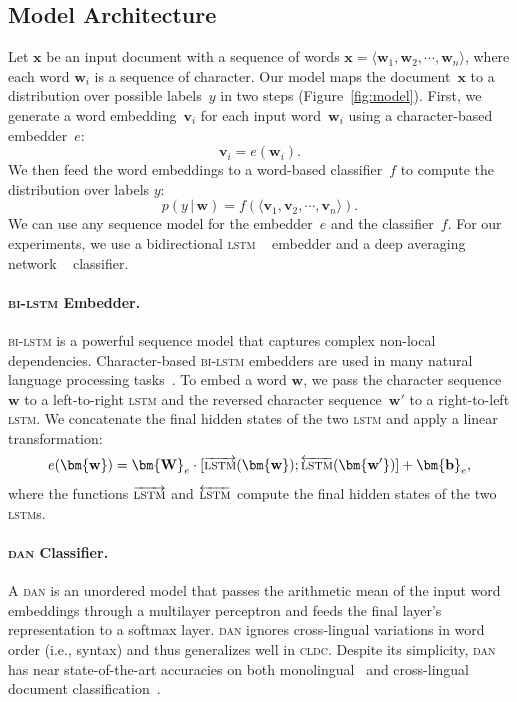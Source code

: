 \documentclass[letterpaper]{article} %
\newcommand{\citep}{\cite}
\newcommand{\g}{\, | \,}
\newcommand{\abr}[1]{\textsc{#1}}
\newcommand{\vect}[1]{\bm{\mathbf{#1}}}
\begin{document}
\subsection{Model Architecture}

Let $\vect{x}$ be an input document with a sequence of words $\vect{x} =
\langle \vect{w}_1, \vect{w}_2, \cdots, \vect{w}_n \rangle$, where each word
$\vect{w}_i$ is a sequence of character.
Our model maps the document~$\vect{x}$ to a distribution over possible
labels~$y$ in two steps (Figure~\ref{fig:model}).
First, we generate a word embedding~$\vect{v}_i$ for each input
word~$\vect{w}_i$ using a character-based embedder~$e$:
\begin{equation}
\vect{v}_i = e(\vect{w}_i).
\end{equation}
We then feed the word embeddings to a word-based classifier~$f$ to compute the
distribution over labels $y$:
\begin{equation}
p(y \g \vect{w}) = f\left( \langle \vect{v}_1, \vect{v}_2, \cdots, \vect{v}_n \rangle \right ).
\end{equation}
We can use any sequence model for the embedder~$e$ and the classifier~$f$.  For
our experiments, we use a bidirectional \abr{lstm}
~\citep[\abr{bi-lstm}]{graves-05} embedder and a deep averaging network
~\citep[\abr{dan}]{iyyer-15-fixed} classifier.

\paragraph{\abr{bi-lstm} Embedder.}
\abr{bi-lstm} is a powerful sequence model that captures complex non-local
dependencies.  Character-based \abr{bi-lstm} embedders are used in
many natural language processing
tasks~\citep{ling-15a,ballesteros-15,lample-16}.
To embed a word $\vect{w}$, we pass the character sequence~$\vect{w}$ to a
left-to-right \abr{lstm} and the reversed character sequence~$\vect{w'}$ to a
right-to-left \abr{lstm}.  We concatenate the final hidden states of the two
\abr{lstm} and apply a linear transformation:
\begin{equation}
e(\vect{w}) = \vect{W}_e \cdot [\overrightarrow{\text{\abr{lstm}}}(\vect{w});
\overleftarrow{\text{\abr{lstm}}}(\vect{w'})] + \vect{b}_e,
\end{equation}
where the functions $\overrightarrow{\text{\abr{lstm}}}$ and
$\overleftarrow{\abr{lstm}}$ compute the final hidden states of the two
\abr{lstm}s.

\paragraph{\abr{dan} Classifier.}
A \abr{dan} is an unordered model that passes the arithmetic mean of the input
word embeddings through a multilayer perceptron and feeds the final layer's
representation to a softmax layer.
\abr{dan} ignores cross-lingual variations in word order (i.e., syntax) and
thus generalizes well in \abr{cldc}.
Despite its simplicity, \abr{dan} has near state-of-the-art accuracies on both
monolingual~\citep{iyyer-15-fixed} and cross-lingual document
classification~\citep{chen-18}.
\end{document}
